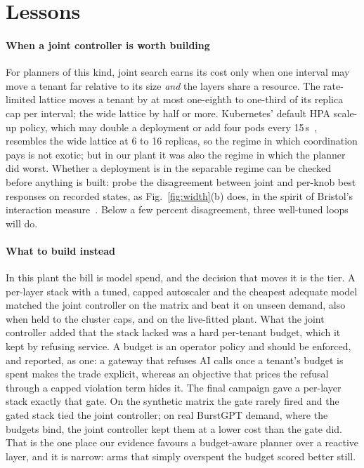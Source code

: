 \section{Lessons}
\label{sec:lessons}

\paragraph{When a joint controller is worth building}
For planners of this kind, joint search earns its cost only when one
interval may move a tenant far relative to its size \emph{and} the layers
share a resource. The rate-limited lattice moves a tenant by at most
one-eighth to one-third of its replica cap per interval; the wide lattice
by half or more. Kubernetes' default HPA scale-up policy, which may double
a deployment or add four pods every 15\,s~\cite{k8shpa}, resembles the wide
lattice at 6 to 16 replicas, so the regime in which coordination pays is
not exotic; but in our plant it was also the regime in which the planner
did worst. Whether a deployment is in the separable regime can be checked
before anything is built: probe the disagreement between joint and per-knob
best responses on recorded states, as Fig.~\ref{fig:width}(b) does, in the
spirit of Bristol's interaction measure~\cite{bristol1966}. Below a few
percent disagreement, three well-tuned loops will do.

\paragraph{What to build instead}
In this plant the bill is model spend, and the decision that moves it is
the tier. A per-layer stack with a tuned, capped autoscaler and the
cheapest adequate model matched the joint controller on the matrix and beat
it on unseen demand, also when held to the cluster caps, and on the
live-fitted plant. What the joint
controller added that the stack lacked was a hard per-tenant budget, which
it kept by refusing service. A budget is an operator policy and should be
enforced, and reported, as one: a gateway that refuses AI calls once a
tenant's budget is spent makes the trade explicit, whereas an objective that
prices the refusal through a capped violation term hides it. The final
campaign gave a per-layer stack exactly that gate. On the synthetic matrix
the gate rarely fired and the gated stack tied the joint controller; on real
BurstGPT demand, where the budgets bind, the joint controller kept them at a
lower cost than the gate did. That is the one place our evidence favours a
budget-aware planner over a reactive layer, and it is narrow: arms that
simply overspent the budget scored better still.

